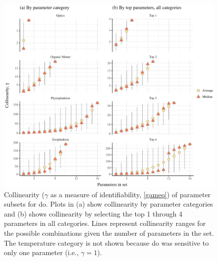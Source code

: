 \documentclass[review]{elsarticle}\usepackage[]{graphicx}\usepackage[]{color}
\makeatletter
\def\maxwidth{ %
  \ifdim\Gin@nat@width>\linewidth
    \linewidth
  \else
    \Gin@nat@width
  \fi
}
\makeatother
\begin{document}
\begin{figure}[!ht]

{\centering \includegraphics[width=\maxwidth]{figs/identplo-1} 

}

\caption{Collinearity ($\gamma$ as a measure of identifiability, \cref{gameq}) of parameter subsets for \ac{do}.  Plots in (a) show collinearity by parameter categories and (b) shows collinearity by selecting the top 1 through 4 parameters in all categories.  Lines represent collinearity ranges for the possible combinations given the number of parameters in the set.  The temperature category is not shown because \ac{do} was sensitive to only one parameter (i.e., $\gamma = 1$).}\label{fig:identplo}
\end{figure}
\end{document}
